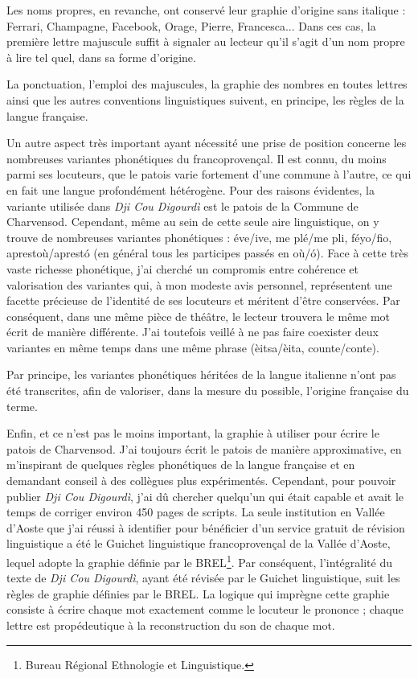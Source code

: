 Les noms propres, en revanche, ont conservé leur graphie d'origine sans italique : Ferrari, Champagne, Facebook, Orage, Pierre, Francesca... Dans ces cas, la première lettre majuscule suffit à signaler au lecteur qu’il s’agit d’un nom propre à lire tel quel, dans sa forme d’origine.

La ponctuation, l'emploi des majuscules, la graphie des nombres en toutes lettres ainsi que les autres conventions linguistiques suivent, en principe, les règles de la langue française.

Un autre aspect très important ayant nécessité une prise de position concerne les nombreuses variantes phonétiques du francoprovençal. Il est connu, du moins parmi ses locuteurs, que le patois varie fortement d’une commune à l’autre, ce qui en fait une langue profondément hétérogène. Pour des raisons évidentes, la variante utilisée dans \textit{Dji Cou Digourdì} est le patois de la Commune de Charvensod. Cependant, même au sein de cette seule aire linguistique, on y trouve de nombreuses variantes phonétiques : éve/ive, me plé/me pli, féyo/fio, aprestoù/aprestó (en général tous les participes passés en où/ó). Face à cette très vaste richesse phonétique, j'ai cherché un compromis entre cohérence et valorisation des variantes qui, à mon modeste avis personnel, représentent une facette précieuse de l'identité de ses locuteurs et méritent d’être conservées. Par conséquent, dans une même pièce de théâtre, le lecteur trouvera le même mot écrit de manière différente. J’ai toutefois veillé à ne pas faire coexister deux variantes en même temps dans une même phrase (èitsa/èita, counte/conte).

Par principe, les variantes phonétiques héritées de la langue italienne n'ont pas été transcrites, afin de valoriser, dans la mesure du possible, l'origine française du terme.

Enfin, et ce n'est pas le moins important, la graphie à utiliser pour écrire le patois de Charvensod. J'ai toujours écrit le patois de manière approximative, en m'inspirant de quelques règles phonétiques de la langue française et en demandant conseil à des collègues plus expérimentés. Cependant, pour pouvoir publier \textit{Dji Cou Digourdì}, j'ai dû chercher quelqu'un qui était capable et avait le temps de corriger environ 450 pages de scripts. La seule institution en Vallée d'Aoste que j'ai réussi à identifier pour bénéficier d'un service gratuit de révision linguistique a été le Guichet linguistique francoprovençal de la Vallée d'Aoste, lequel adopte la graphie définie par le BREL\footnote{ Bureau Régional Ethnologie et Linguistique.}. Par conséquent, l'intégralité du texte de \textit{Dji Cou Digourdì}, ayant été révisée par le Guichet linguistique, suit les règles de graphie définies par le BREL. La logique qui imprègne cette graphie consiste à écrire chaque mot exactement comme le locuteur le prononce ; chaque lettre est propédeutique à la reconstruction du son de chaque mot.


